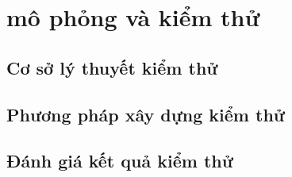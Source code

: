 \clearpage
{}

\setcounter{chapter}{3}
\chapter[{MÔ PHỎNG VÀ KIỂM THỬ}]{mô phỏng và kiểm thử}
\section{Cơ sở lý thuyết kiểm thử}
\section{Phương pháp xây dựng kiểm thử}
\section{Đánh giá kết quả kiểm thử}

